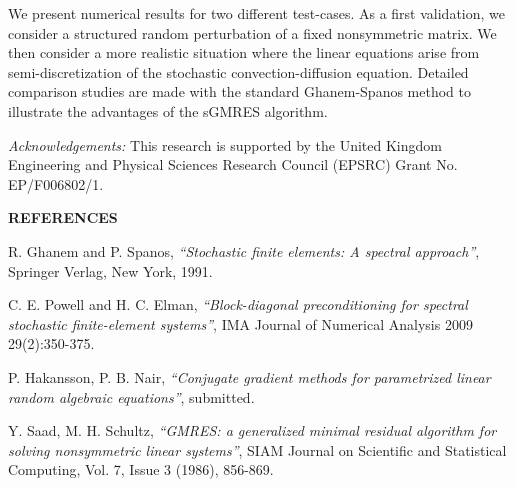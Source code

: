 \documentclass{report}
\begin{document}
We present numerical results for two different test-cases. As a first
validation, we consider a structured random perturbation of a fixed
nonsymmetric matrix. We then consider a more realistic situation where
the linear equations arise from semi-discretization of the stochastic
convection-diffusion equation. Detailed comparison studies are made with
the standard Ghanem-Spanos method to illustrate the advantages of the
sGMRES algorithm.

\noindent
{\em Acknowledgements:} This research is supported by the United Kingdom
Engineering and Physical Sciences Research Council (EPSRC) Grant No.
EP/F006802/1.

\begin{center}
{\bf REFERENCES}
\end{center}

\noindent
[1] R. Ghanem and P. Spanos, {\it{``Stochastic finite elements: A
spectral approach''}}, Springer Verlag, New York, 1991.

\noindent
[2] C. E. Powell and H. C. Elman, {\it{``Block-diagonal preconditioning
for spectral stochastic finite-element systems''}}, IMA Journal of
Numerical Analysis 2009 29(2):350-375.

\noindent
[3] P. Hakansson, P. B. Nair, {\it{``Conjugate gradient methods for
parametrized linear random algebraic equations''}}, submitted.

\noindent
[4] Y. Saad, M. H. Schultz, {\it{``GMRES: a generalized minimal residual
algorithm for solving nonsymmetric linear systems''}},
SIAM Journal on Scientific and Statistical Computing, Vol. 7, Issue 3 (1986), 856-869.
\end{document}

